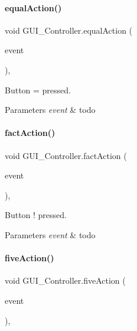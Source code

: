 \paragraph{\texorpdfstring{equal\+Action()}{equalAction()}}
{\footnotesize\ttfamily void G\+U\+I\+\_\+\+Controller.\+equal\+Action (\begin{DoxyParamCaption}\item[{Action\+Event}]{event }\end{DoxyParamCaption})\hspace{0.3cm}{\ttfamily [inline]}, {\ttfamily [private]}}



Button \textquotesingle{}=\textquotesingle{} pressed. 


\begin{DoxyParams}{Parameters}
{\em event} & todo \\
\hline
\end{DoxyParams}
\mbox{\label{classGUI__Controller_a254bda9a37fb413e27572c045b6329f6}} 
\paragraph{\texorpdfstring{fact\+Action()}{factAction()}}
{\footnotesize\ttfamily void G\+U\+I\+\_\+\+Controller.\+fact\+Action (\begin{DoxyParamCaption}\item[{Action\+Event}]{event }\end{DoxyParamCaption})\hspace{0.3cm}{\ttfamily [inline]}, {\ttfamily [private]}}



Button \textquotesingle{}!\textquotesingle{} pressed. 


\begin{DoxyParams}{Parameters}
{\em event} & todo \\
\hline
\end{DoxyParams}
\mbox{\label{classGUI__Controller_a9066c255f0d91d630948ab792319d59d}} 
\paragraph{\texorpdfstring{five\+Action()}{fiveAction()}}
{\footnotesize\ttfamily void G\+U\+I\+\_\+\+Controller.\+five\+Action (\begin{DoxyParamCaption}\item[{Action\+Event}]{event }\end{DoxyParamCaption})\hspace{0.3cm}{\ttfamily [inline]}, {\ttfamily [private]}}



